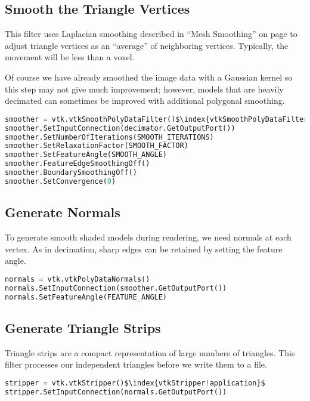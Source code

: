 \subsection{Smooth the Triangle Vertices}

This filter uses Laplacian smoothing described in ``Mesh Smoothing'' on page \pageref{subsec:mesh_smoothing} to adjust triangle vertices as an ``average'' of neighboring vertices. Typically, the movement will be less than a voxel.

Of course we have already smoothed the image data with a Gaussian kernel so this step may not give much improvement; however, models that are heavily decimated can sometimes be improved with additional polygonal smoothing.

\begin{lstlisting}[language=Python, caption={Smooth the Triangle Vertices.}, escapechar=\$]
smoother = vtk.vtkSmoothPolyDataFilter()$\index{vtkSmoothPolyDataFilter!application}$
smoother.SetInputConnection(decimator.GetOutputPort())
smoother.SetNumberOfIterations(SMOOTH_ITERATIONS)
smoother.SetRelaxationFactor(SMOOTH_FACTOR)
smoother.SetFeatureAngle(SMOOTH_ANGLE)
smoother.FeatureEdgeSmoothingOff()
smoother.BoundarySmoothingOff()
smoother.SetConvergence(0)
\end{lstlisting}

\subsection{Generate Normals}
To generate smooth shaded models during rendering, we need normals at each vertex. As in decimation, sharp edges can be retained by setting the feature angle.

\begin{lstlisting}[language=Python, caption={Generate Normals.}]
normals = vtk.vtkPolyDataNormals()
normals.SetInputConnection(smoother.GetOutputPort())
normals.SetFeatureAngle(FEATURE_ANGLE)
\end{lstlisting}

\subsection{Generate Triangle Strips}

Triangle strips are a compact representation of large numbers of triangles. This filter processes our independent triangles before we write them to a file.

\begin{lstlisting}[language=Python, caption={Generate Triangle Strips.}, escapechar=\$]
stripper = vtk.vtkStripper()$\index{vtkStripper!application}$
stripper.SetInputConnection(normals.GetOutputPort())
\end{lstlisting}

